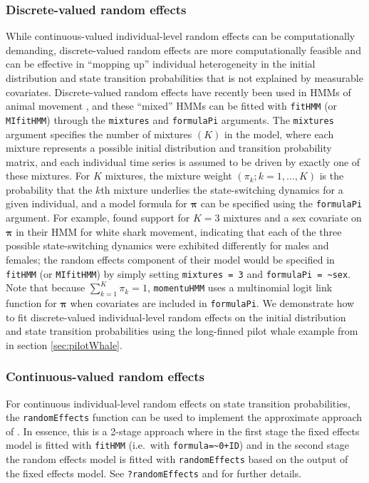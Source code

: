\documentclass[12pt]{article}\usepackage[]{graphicx}\usepackage[]{xcolor}
\begin{document}
\subsubsection{Discrete-valued random effects}
While continuous-valued individual-level random effects can be computationally demanding, discrete-valued random effects are more computationally feasible and can be effective in ``mopping up'' individual heterogeneity in the initial distribution and state transition probabilities that is not explained by measurable covariates. Discrete-valued random effects have recently been used in HMMs of animal movement \citep[e.g.][]{McKellarEtAl2014,TownerEtAl2016,DeRuiterEtAl2017,IsojunnoEtAl2017}, and these ``mixed'' HMMs can be fitted with \verb|fitHMM| (or \verb|MIfitHMM|) through the \verb|mixtures| and \verb|formulaPi| arguments.  The \verb|mixtures| argument specifies the number of mixtures $(K)$ in the model, where each mixture represents a possible initial distribution and transition probability matrix, and each individual time series is assumed to be driven by exactly one of these mixtures. For $K$ mixtures, the mixture weight $(\pi_k; k=1,\ldots,K)$ is the probability that the $k$th mixture underlies the state-switching dynamics for a given individual, and a model formula for ${\boldsymbol \pi}$ can be specified using the \verb|formulaPi| argument. For example, \cite{TownerEtAl2016} found support for $K=3$ mixtures and a sex covariate on ${\boldsymbol \pi}$ in their HMM for white shark movement, indicating that each of the three possible state-switching dynamics were exhibited differently for males and females; the random effects component of their model would be specified in \verb|fitHMM| (or \verb|MIfitHMM|) by simply setting \verb|mixtures = 3| and \verb|formulaPi = ~sex|. Note that because $\sum_{k=1}^K \pi_k = 1$, \verb|momentuHMM| uses a multinomial logit link function for ${\boldsymbol \pi}$ when covariates are included in \verb|formulaPi|. We demonstrate how to fit discrete-valued individual-level random effects on the initial distribution and state transition probabilities using the long-finned pilot whale example from \cite{IsojunnoEtAl2017} in section \ref{sec:pilotWhale}.

\subsubsection{Continuous-valued random effects}
For continuous individual-level random effects on state transition probabilities, the \verb|randomEffects| function can be used to implement the approximate approach of \citet{BurnhamWhite2002}. In essence, this is a 2-stage approach where in the first stage the fixed effects model is fitted with \verb|fitHMM| (i.e.\ with \verb|formula=~0+ID|) and in the second stage the random effects model is fitted with \verb|randomEffects| based on the output of the fixed effects model. See \verb|?randomEffects| and \citet{McClintock2021} for further details.
\end{document}
